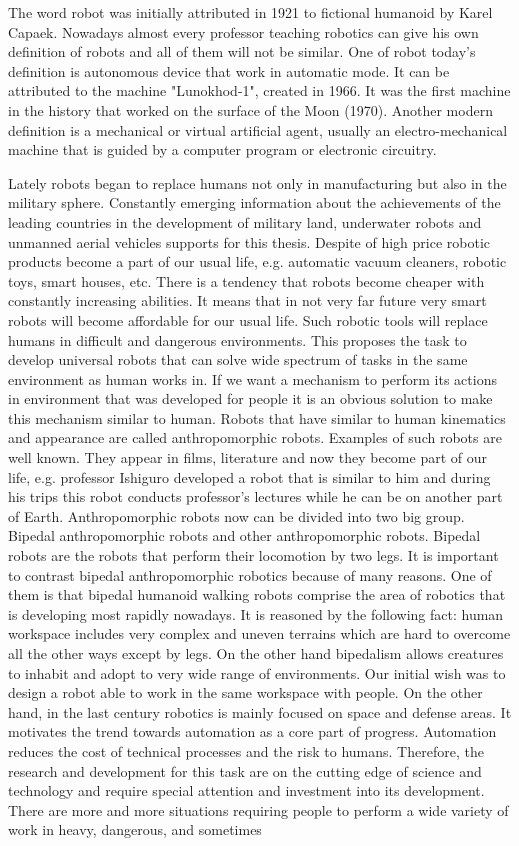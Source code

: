 \documentclass[12pt,a4paper]{report}
\begin{document}
		The word robot was initially attributed in 1921 to fictional humanoid by Karel Capaek. Nowadays almost every professor teaching robotics can give his own definition of robots and all of them will not be similar. One of robot today's definition is autonomous device that work in automatic mode. It can be attributed to the machine "Lunokhod-1", created in 1966. It was the first machine in the history that worked on the surface of the Moon (1970). Another modern definition is a mechanical or virtual artificial agent, usually an electro-mechanical machine that is guided by a computer program or electronic circuitry.
		
		Lately robots began to replace humans not only in manufacturing but also in the military sphere. Constantly emerging information about the achievements of the leading countries in the development of military land, underwater robots and unmanned aerial vehicles supports for this thesis. Despite of high price robotic products become a part of our usual life, e.g. automatic vacuum cleaners, robotic toys, smart houses, etc. There is a tendency that robots become cheaper with constantly increasing abilities. It means that in not very far future very smart robots will become affordable for our usual life. Such robotic tools will replace humans in difficult and dangerous environments. This proposes the task to develop universal robots that can solve wide spectrum of tasks in the same environment as human works in. If we want a mechanism to perform its actions in environment that was developed for people it is an obvious solution to make this mechanism similar to human. Robots that have similar to human kinematics and appearance are called anthropomorphic robots. Examples of such robots are well known. They appear in films, literature and now they become part of our life, e.g. professor Ishiguro developed a robot that is similar to him and during his trips this robot conducts professor's lectures while he can be on another part of Earth. Anthropomorphic robots now can be divided into two big group. Bipedal anthropomorphic robots and other anthropomorphic robots. Bipedal robots are the robots that perform their locomotion by two legs. It is important to contrast bipedal anthropomorphic robotics because of many reasons. One of them is that bipedal humanoid walking robots comprise the area of robotics that is developing most rapidly nowadays. It is reasoned by the following fact: human workspace includes very complex and uneven terrains which are hard to overcome all the other ways except by legs. On the other hand bipedalism allows creatures to inhabit and adopt to very wide range of environments. Our initial wish was to design a robot able to work in the same workspace with people. On the other hand, in the last century robotics is mainly focused on space and defense areas. It motivates the trend towards automation as a core part of progress. Automation reduces the cost of technical processes and the risk to humans. Therefore, the research and development for this task are on the cutting edge of science and technology and require special attention and investment into its development. There are more and more situations requiring people to perform a wide variety of work in heavy, dangerous, and sometimes 
\end{document}
